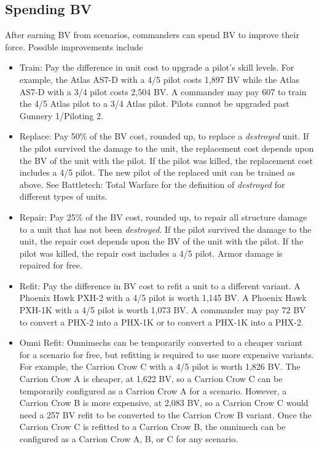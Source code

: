 \documentclass[UTF8]{article}
\begin{document}
\newpage

\subsection{Spending BV}

After earning BV from scenarios, commanders can spend BV to improve their force.
Possible improvements include

\begin{itemize}

\item Train: Pay the difference in unit cost to upgrade a pilot's skill levels.
For example, the Atlas AS7-D with a 4/5 pilot costs 1,897 BV while the Atlas AS7-D with a 3/4 pilot costs 2,504 BV.
A commander may pay 607 to train the 4/5 Atlas pilot to a 3/4 Atlas pilot.
Pilots cannot be upgraded past Gunnery 1/Piloting 2.

\item Replace: Pay 50\% of the BV cost, rounded up, to replace a \emph{destroyed} unit.
If the pilot survived the damage to the unit, the replacement cost depends upon the BV of the unit with the pilot.
If the pilot was killed, the replacement cost includes a 4/5 pilot.
The new pilot of the replaced unit can be trained as above.
See Battletech: Total Warfare for the definition of \emph{destroyed} for different types of units.

\item Repair: Pay 25\% of the BV cost, rounded up, to repair all structure damage to a unit that has not been \emph{destroyed}.
If the pilot survived the damage to the unit, the repair cost depends upon the BV of the unit with the pilot.
If the pilot was killed, the repair cost includes a 4/5 pilot.
Armor damage is repaired for free.

\item Refit: Pay the difference in BV cost to refit a unit to a different variant.
A Phoenix Hawk PXH-2 with a 4/5 pilot is worth 1,145 BV.
A Phoenix Hawk PXH-1K with a 4/5 pilot is worth 1,073 BV.
A commander may pay 72 BV to convert a PHX-2 into a PHX-1K or to convert a PHX-1K into a PHX-2.

\item Omni Refit: Omnimechs can be temporarily converted to a cheaper variant for a scenario for free, but refitting is required to use more expensive variants.
For example, the Carrion Crow C with a 4/5 pilot is worth 1,826 BV.
The Carrion Crow A is cheaper, at 1,622 BV, so a Carrion Crow C can be temporarily configured as a Carrion Crow A for a scenario.
However, a Carrion Crow B is more expensive, at 2,083 BV, so a Carrion Crow C would need a 257 BV refit to be converted to the Carrion Crow B variant.
Once the Carrion Crow C is refitted to a Carrion Crow B, the omnimech can be configured as a Carrion Crow A, B, or C for any scenario.


\end{itemize}
\end{document}
